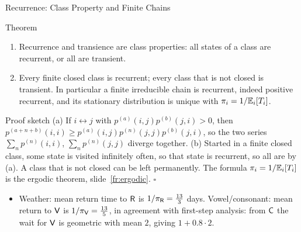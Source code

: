 \begin{frame}{Recurrence: Class Property and Finite Chains}
  \label{fr:recclass}
  \small
  \begin{block}{Theorem}
    \begin{enumerate}
      \item[(a)] Recurrence and transience are class properties: all states of a class are recurrent, or all are transient.
      \item[(b)] Every finite closed class is recurrent; every class that is not closed is transient. In particular a finite irreducible chain is recurrent, indeed positive recurrent, and its stationary distribution is unique with $\pi_i=1/\mathbb{E}_i[T_i]$.
    \end{enumerate}
  \end{block}
  \begin{block}{Proof sketch}
    (a) If $i\leftrightarrow j$ with $p^{(a)}(i,j)p^{(b)}(j,i)>0$, then $p^{(a+n+b)}(i,i)\ge p^{(a)}(i,j)p^{(n)}(j,j)p^{(b)}(j,i)$, so the two series $\sum_np^{(n)}(i,i)$, $\sum_np^{(n)}(j,j)$ diverge together. (b) Started in a finite closed class, some state is visited infinitely often, so that state is recurrent, so all are by (a). A class that is not closed can be left permanently. The formula $\pi_i=1/\mathbb{E}_i[T_i]$ is the ergodic theorem, slide~\ref{fr:ergodic}. \hfill$\square$
  \end{block}
  \begin{itemize}
    \item Weather: mean return time to $\mathsf{R}$ is $1/\pi_{\mathsf{R}}=\tfrac{13}3$ days. Vowel/consonant: mean return to $\mathsf{V}$ is $1/\pi_{\mathsf{V}}=\tfrac{13}5$, in agreement with first-step analysis: from $\mathsf{C}$ the wait for $\mathsf{V}$ is geometric with mean $2$, giving $1+0.8\cdot2$.
  \end{itemize}
\end{frame}

